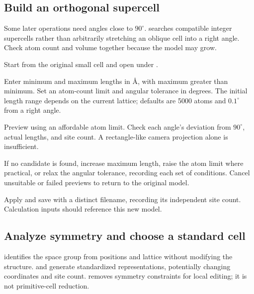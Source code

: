 

\subsection{Build an orthogonal supercell}\label{sec:orthogonal-cell-reference}

Some later operations need angles close to $90^\circ$.  searches compatible integer supercells rather than arbitrarily stretching an oblique cell into a right angle. Check atom count and volume together because the model may grow.

\begin{steps}
  \item Start from the original small cell and open  under .
  \item Enter minimum and maximum lengths in \AA, with maximum greater than minimum. Set an atom-count limit and angular tolerance in degrees. The initial length range depends on the current lattice; defaults are 5000 atoms and $0.1^\circ$ from a right angle.
  \item Preview using an affordable atom limit. Check each angle's deviation from $90^\circ$, actual lengths, and site count. A rectangle-like camera projection alone is insufficient.
  \item If no candidate is found, increase maximum length, raise the atom limit where practical, or relax the angular tolerance, recording each set of conditions. Cancel unsuitable or failed previews to return to the original model.
  \item Apply and save with a distinct filename, recording its independent site count. Calculation inputs should reference this new model.
\end{steps}

\subsection{Analyze symmetry and choose a standard cell}\label{sec:symmetry-reference}

 identifies the space group from positions and lattice without modifying the structure.  and  generate standardized representations, potentially changing coordinates and site count.  removes symmetry constraints for local editing; it is not primitive-cell reduction.

